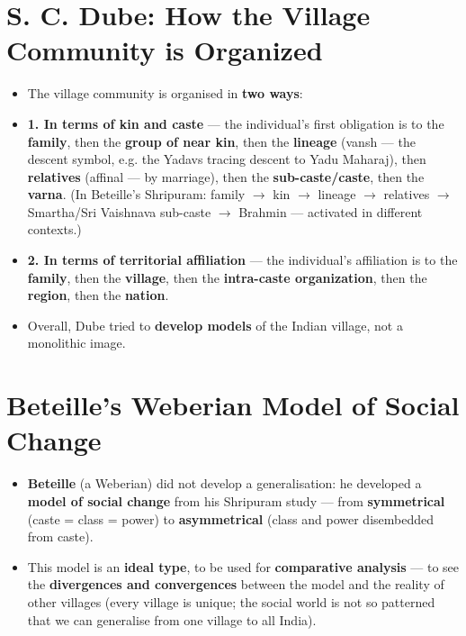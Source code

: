\section{S. C. Dube: How the Village Community is Organized}

\begin{KeyConcept}
\begin{itemize}
\item The village community is organised in \textbf{two ways}:
\item \textbf{1. In terms of kin and caste} --- the individual's first obligation is to the \textbf{family}, then the \textbf{group of near kin}, then the \textbf{lineage} (vansh --- the descent symbol, e.g. the Yadavs tracing descent to Yadu Maharaj), then \textbf{relatives} (affinal --- by marriage), then the \textbf{sub-caste/caste}, then the \textbf{varna}. (In Beteille's Shripuram: family $\rightarrow$ kin $\rightarrow$ lineage $\rightarrow$ relatives $\rightarrow$ Smartha/Sri Vaishnava sub-caste $\rightarrow$ Brahmin --- activated in different contexts.)
\item \textbf{2. In terms of territorial affiliation} --- the individual's affiliation is to the \textbf{family}, then the \textbf{village}, then the \textbf{intra-caste organization}, then the \textbf{region}, then the \textbf{nation}.
\item Overall, Dube tried to \textbf{develop models} of the Indian village, not a monolithic image.
\end{itemize}
\end{KeyConcept}

\section{Beteille's Weberian Model of Social Change}

\begin{KeyConcept}
\begin{itemize}
\item \textbf{Beteille} (a Weberian) did not develop a generalisation: he developed a \textbf{model of social change} from his Shripuram study --- from \textbf{symmetrical} (caste = class = power) to \textbf{asymmetrical} (class and power disembedded from caste).
\item This model is an \textbf{ideal type}, to be used for \textbf{comparative analysis} --- to see the \textbf{divergences and convergences} between the model and the reality of other villages (every village is unique; the social world is not so patterned that we can generalise from one village to all India).
\end{itemize}
\end{KeyConcept}


